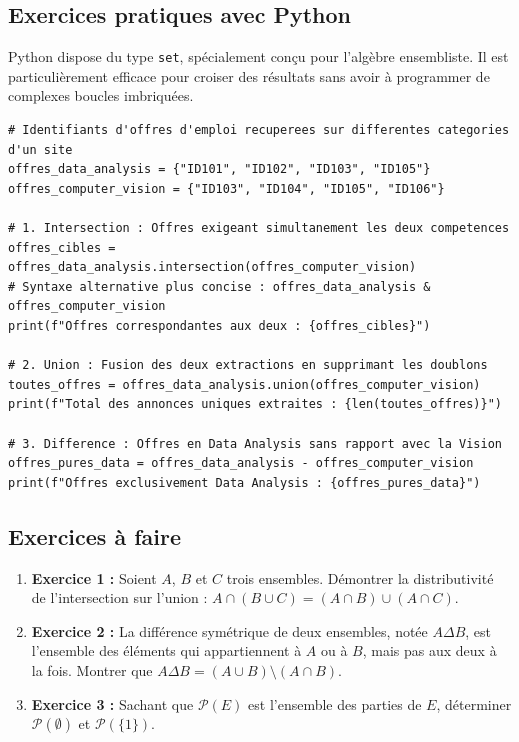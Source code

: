 \subsection{Exercices pratiques avec Python}
Python dispose du type \texttt{set}, spécialement conçu pour l'algèbre ensembliste. Il est particulièrement efficace pour croiser des résultats sans avoir à programmer de complexes boucles imbriquées.

\begin{lstlisting}
# Identifiants d'offres d'emploi recuperees sur differentes categories d'un site
offres_data_analysis = {"ID101", "ID102", "ID103", "ID105"}
offres_computer_vision = {"ID103", "ID104", "ID105", "ID106"}

# 1. Intersection : Offres exigeant simultanement les deux competences
offres_cibles = offres_data_analysis.intersection(offres_computer_vision)
# Syntaxe alternative plus concise : offres_data_analysis & offres_computer_vision
print(f"Offres correspondantes aux deux : {offres_cibles}")

# 2. Union : Fusion des deux extractions en supprimant les doublons
toutes_offres = offres_data_analysis.union(offres_computer_vision)
print(f"Total des annonces uniques extraites : {len(toutes_offres)}")

# 3. Difference : Offres en Data Analysis sans rapport avec la Vision
offres_pures_data = offres_data_analysis - offres_computer_vision
print(f"Offres exclusivement Data Analysis : {offres_pures_data}")
\end{lstlisting}

\subsection{Exercices à faire}
\begin{enumerate}
    \item \textbf{Exercice 1 :} Soient $A$, $B$ et $C$ trois ensembles. Démontrer la distributivité de l'intersection sur l'union : $A \cap (B \cup C) = (A \cap B) \cup (A \cap C)$.
    \item \textbf{Exercice 2 :} La différence symétrique de deux ensembles, notée $A \Delta B$, est l'ensemble des éléments qui appartiennent à $A$ ou à $B$, mais pas aux deux à la fois. Montrer que $A \Delta B = (A \cup B) \setminus (A \cap B)$.
    \item \textbf{Exercice 3 :} Sachant que $\mathcal{P}(E)$ est l'ensemble des parties de $E$, déterminer $\mathcal{P}(\emptyset)$ et $\mathcal{P}(\{1\})$.
\end{enumerate}

